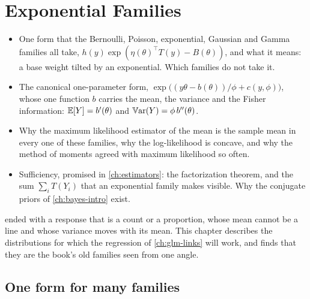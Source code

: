\chapter{Exponential Families}
\label{ch:exp-families}

\begin{chaptergoals}
\begin{itemize}[nosep]
\item One form that the Bernoulli, Poisson, exponential, Gaussian and Gamma families all take, $h(y)\exp(\eta(\theta)^\top T(y) - B(\theta))$, and what it means: a base weight tilted by an exponential. Which families do not take it.
\item The canonical one-parameter form, $\exp\big((y\theta - b(\theta))/\phi + c(y, \phi)\big)$, whose one function $b$ carries the mean, the variance and the Fisher information: $\operatorname*{\mathbb{E}}[Y] = b'(\theta)$ and $\operatorname*{\mathbb{V}\text{ar}}(Y) = \phi\,b''(\theta)$.
\item Why the maximum likelihood estimator of the mean is the sample mean in every one of these families, why the log-likelihood is concave, and why the method of moments agreed with maximum likelihood so often.
\item Sufficiency, promised in \cref{ch:estimators}: the factorization theorem, and the sum $\sum_i T(Y_i)$ that an exponential family makes visible. Why the conjugate priors of \cref{ch:bayes-intro} exist.
\end{itemize}
 ended with a response that is a count or a proportion, whose mean cannot be a line and whose variance moves with its mean. This chapter describes the distributions for which the regression of \cref{ch:glm-links} will work, and finds that they are the book's old families seen from one angle.
\end{chaptergoals}

\section{One form for many families}
\label{sec:ef-form}

